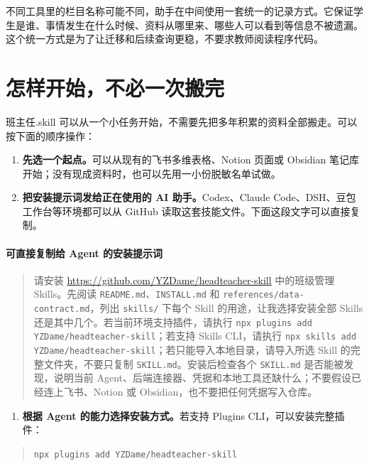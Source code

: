 \documentclass[11pt,a4paper,fontset=none]{ctexart}
\begin{document}
不同工具里的栏目名称可能不同，助手在中间使用一套统一的记录方式。它保证学生是谁、事情发生在什么时候、资料从哪里来、哪些人可以看到等信息不被遗漏。这个统一方式是为了让迁移和后续查询更稳，不要求教师阅读程序代码。

\section{怎样开始，不必一次搬完}

班主任.skill 可以从一个小任务开始，不需要先把多年积累的资料全部搬走。可以按下面的顺序操作：

\begin{enumerate}
  \item \textbf{先选一个起点。}可以从现有的飞书多维表格、Notion 页面或 Obsidian 笔记库开始；没有现成资料时，也可以先用一小份脱敏名单试做。
  \item \textbf{把安装提示词发给正在使用的 AI 助手。}Codex、Claude Code、DSH、豆包工作台等环境都可以从 GitHub 读取这套技能文件。下面这段文字可以直接复制。
\end{enumerate}

\paragraph{可直接复制给 Agent 的安装提示词}

\begin{quote}
\small
\raggedright
请安装 \url{https://github.com/YZDame/headteacher-skill} 中的班级管理 Skills。先阅读 \texttt{README.md}、\texttt{INSTALL.md} 和 \texttt{references/data-contract.md}，列出 \texttt{skills/} 下每个 Skill 的用途，让我选择安装全部 Skills 还是其中几个。若当前环境支持插件，请执行 \texttt{npx plugins add YZDame/headteacher-skill}；若支持 Skills CLI，请执行 \texttt{npx skills add YZDame/headteacher-skill}；若只能导入本地目录，请导入所选 Skill 的完整文件夹，不要只复制 \texttt{SKILL.md}。安装后检查各个 \texttt{SKILL.md} 是否能被发现，说明当前 Agent、后端连接器、凭据和本地工具还缺什么；不要假设已经连上飞书、Notion 或 Obsidian，也不要把任何凭据写入仓库。
\end{quote}

\begin{enumerate}[resume]
  \item \textbf{根据 Agent 的能力选择安装方式。}若支持 Plugins CLI，可以安装完整插件：
\end{enumerate}

\begin{quote}
\texttt{npx plugins add YZDame/headteacher-skill}
\end{quote}
\end{document}

